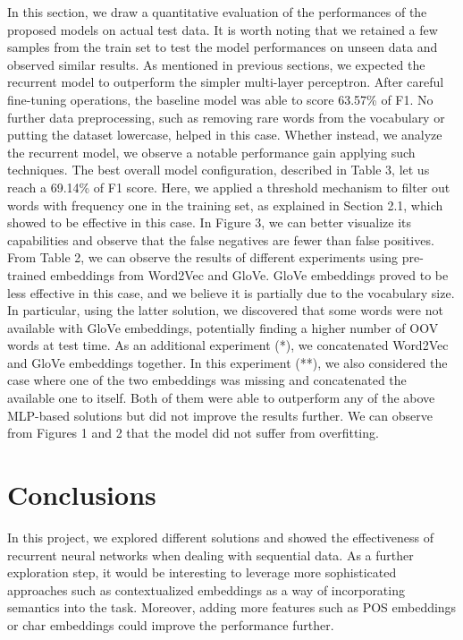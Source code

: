 \documentclass[11pt,a4paper]{article}
\begin{document}
In this section, we draw a quantitative evaluation of the performances of the proposed models on actual test data. It is worth noting that we retained a few samples from the train set to test the model performances on unseen data and observed similar results. As mentioned in previous sections, we expected the recurrent model to outperform the simpler multi-layer perceptron. After careful fine-tuning operations, the baseline model was able to score 63.57\% of F1. No further data preprocessing, such as removing rare words from the vocabulary or putting the dataset lowercase, helped in this case. Whether instead, we analyze the recurrent model, we observe a notable performance gain applying such techniques. The best overall model configuration, described in Table 3, let us reach a 69.14\% of F1 score. Here, we applied a threshold mechanism to filter out words with frequency one in the training set, as explained in Section 2.1, which showed to be effective in this case. In Figure 3, we can better visualize its capabilities and observe that the false negatives are fewer than false positives. From Table 2, we can observe the results of different experiments using pre-trained embeddings from Word2Vec and GloVe. GloVe embeddings proved to be less effective in this case, and we believe it is partially due to the vocabulary size. In particular, using the latter solution, we discovered that some words were not available with GloVe embeddings, potentially finding a higher number of OOV words at test time. As an additional experiment (*), we concatenated Word2Vec and GloVe embeddings together. In this experiment (**), we also considered the case where one of the two embeddings was missing and concatenated the available one to itself. Both of them were able to outperform any of the above MLP-based solutions but did not improve the results further. We can observe from Figures 1 and 2 that the model did not suffer from overfitting.

\section{Conclusions}

In this project, we explored different solutions and showed the effectiveness of recurrent neural networks when dealing with sequential data. As a further exploration step, it would be interesting to leverage more sophisticated approaches such as contextualized embeddings as a way of incorporating semantics into the task. Moreover, adding more features such as POS embeddings or char embeddings could improve the performance further.
\end{document}
